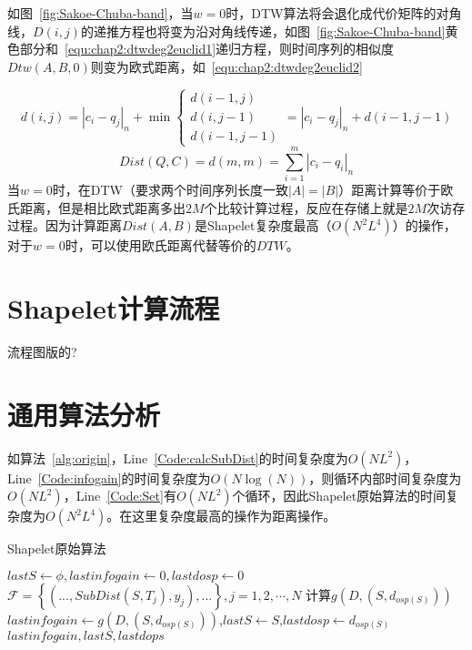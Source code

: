 如图~\ref{fig:Sakoe-Chuba-band}，当$w=0$时，DTW算法将会退化成代价矩阵的对角线，$D(i,j)$的递推方程也将变为沿对角线传递，如图~\ref{fig:Sakoe-Chuba-band}黄色部分和~\ref{equ:chap2:dtwdeg2euclid1}递归方程，则时间序列的相似度$Dtw(A,B,0)$则变为欧式距离，如~\ref{equ:chap2:dtwdeg2euclid2}


\begin{equation}
\label{equ:chap2:dtwdeg2euclid1}
d(i,j) = |c_i-q_j|_n + \min
\begin{cases}
d(i-1,j)\\
d(i,j-1)\\
d(i-1,j-1)
\end{cases} = |c_i-q_j|_n + d(i-1,j-1)
\end{equation}
\begin{equation}
\label{equ:chap2:dtwdeg2euclid2}
Dist(Q,C) = d(m,m) = \sum_{i=1}^{m}|c_i-q_i|_n
\end{equation}
当$w=0$时，在DTW（要求两个时间序列长度一致$|A|=|B|$）距离计算等价于欧氏距离，但是相比欧式距离多出$2M$个比较计算过程，反应在存储上就是$2M$次访存过程。因为计算距离$Dist(A,B)$是Shapelet复杂度最高（$O(N^2L^4)$）的操作，对于$w=0$时，可以使用欧氏距离代替等价的$DTW$。

\section{Shapelet计算流程}
流程图版的?


\section{通用算法分析}
\label{cha:chap02:generalalganalysis}

如算法~\ref{alg:origin}，Line~\ref{Code:calcSubDist}的时间复杂度为$O(NL^2)$，Line~\ref{Code:infogain}的时间复杂度为$O(N\log(N))$，则循环内部时间复杂度为$O(NL^2)$，Line~\ref{Code:Set}有$O(NL^2)$个循环，因此Shapelet原始算法的时间复杂度为$O(N^2L^4)$。在这里复杂度最高的操作为距离操作。

\begin{algorithm}
	\caption{Shapelet原始算法}
	\label{alg:origin}
	\begin{algorithmic}[1]
			\State $lastS \gets \phi, lastinfogain \gets 0, lastdosp \gets 0$ 
			 \label{Code:Set}
				\State $\mathcal{F} = \left\lbrace (...,SubDist(S,T_j),y_j),...\right\rbrace,j = 1,2,\cdots,N$ \label{Code:calcSubDist}
				\State 计算$g(D,(S,d_{osp(S)}))$ \label{Code:infogain}
					\State $lastinfogain \gets g(D,(S,d_{osp(S)}))$,$lastS\gets S$,$lastdosp\gets d_{osp(S)}$
				\EndIf
			\EndFor
			\State \Return $lastinfogain,lastS,lastdops$
		\EndFunction
	\end{algorithmic}
\end{algorithm}


{\color{red}{需要写一写其他算法，做一下对比，这部分应该移到计算流程上去，这个地方放算法对比}}



